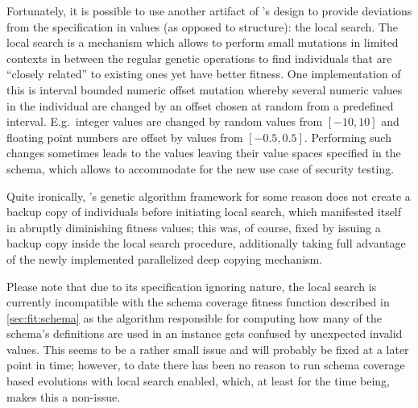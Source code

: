 Fortunately, it is possible to use another artifact of \evosuite's design to provide deviations from the 
specification in values (as opposed to structure): the local search. 
The local search is a mechanism which allows to perform small mutations in limited contexts in between 
the regular genetic operations to find individuals that are ``closely related'' to existing ones
yet have better fitness. One implementation of this is interval bounded numeric offset mutation whereby
several numeric values in the individual are changed by an offset chosen at random from a predefined 
interval. E.g.\ integer values are changed by random values from $[-10,10]$ and floating point numbers 
are offset by values from $[-0.5,0.5]$.
Performing such changes sometimes leads to the values leaving their value spaces specified in the schema, 
which allows to accommodate for the new use case of security testing.

Quite ironically, \evosuite's genetic algorithm framework for some reason does not create a backup 
copy of individuals before initiating local search, which manifested itself in abruptly diminishing 
fitness values; this was, of course, fixed by issuing a backup copy inside the local search procedure, 
additionally taking full advantage of the newly implemented parallelized deep copying mechanism.

Please note that due to its specification ignoring nature, the local search is currently incompatible with the
schema coverage fitness function described in \cref{sec:fit:schema} as the algorithm responsible for computing
how many of the schema's definitions are used in an \xml instance gets confused by unexpected invalid values.
This seems to be a rather small issue and will probably be fixed at a later point in time; however, to date
there has been no reason to run schema coverage based evolutions with local search enabled, which, at least for
the time being, makes this a non-issue.
